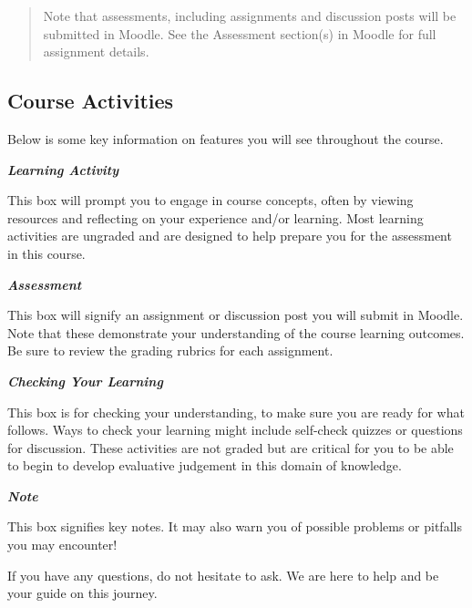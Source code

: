 \documentclass[
]{book}
\begin{document}
\begin{quote}
Note that assessments, including assignments and discussion posts will be submitted in Moodle. See the Assessment section(s) in Moodle for full assignment details.
\end{quote}

\hypertarget{course-activities}{%
\subsection*{Course Activities}\label{course-activities}}

Below is some key information on features you will see throughout the course.

\begin{reflect}
\textbf{\emph{Learning Activity}}

This box will prompt you to engage in course concepts, often by viewing resources and reflecting on your experience and/or learning. Most learning activities are ungraded and are designed to help prepare you for the assessment in this course.
\end{reflect}

\begin{assessment}
\textbf{\emph{Assessment}}

This box will signify an assignment or discussion post you will submit in Moodle. Note that these demonstrate your understanding of the course learning outcomes. Be sure to review the grading rubrics for each assignment.
\end{assessment}

\begin{progress}
\textbf{\emph{Checking Your Learning}}

This box is for checking your understanding, to make sure you are ready for what follows. Ways to check your learning might include self-check quizzes or questions for discussion. These activities are not graded but are critical for you to be able to begin to develop evaluative judgement in this domain of knowledge.
\end{progress}

\begin{caution}
\textbf{\emph{Note}}

This box signifies key notes. It may also warn you of possible problems or pitfalls you may encounter!
\end{caution}

If you have any questions, do not hesitate to ask. We are here to help and be your guide on this journey.
\end{document}
